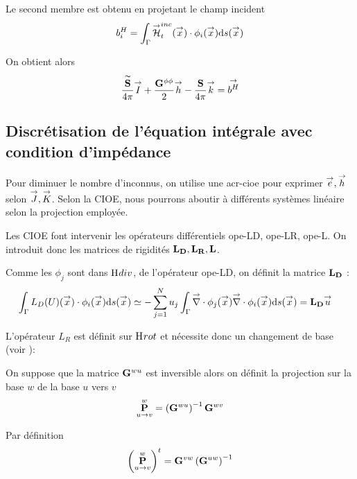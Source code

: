       Le second membre est obtenu en projetant le champ incident 
      \begin{equation}
        b_i^H = \int_\Gamma \vH^{inc}_t(\vx) \cdot \phi_i(\vx)\dd{s}(\vx)
      \end{equation}

      On obtient alors 
      \begin{equation}
        \frac{\mSt}{4\pi}\vect{I} 
        + \frac{\mG{\phi}{\phi}}{2}\vect{h}
        - \frac{\mS}{4\pi}\vect{k} 
        = \vect{b^H}
      \end{equation}

  \subsection{Discrétisation de l'équation intégrale avec condition d'impédance}
    Pour diminuer le nombre d'inconnus, on utilise une \gls{acr-cioe} pour exprimer \(\vect{e}, \vect{h}\) selon \(\vect{J}, \vect{K}\). Selon la CIOE, nous pourrons aboutir à différents systèmes linéaire selon la projection employée. 

    Les CIOE font intervenir les opérateurs différentiels \gls{ope-LD}, \gls{ope-LR}, \gls{ope-L}. On introduit donc les matrices de rigidités \(\mLD,\mLR,\mL\).

    Comme les \(\phi_j\) sont dans \(\Hdiv\), de l'opérateur \gls{ope-LD}, on définit la matrice \(\mLD\) :
    \begin{align}
      \int_\Gamma L_D(U)(\vx) \cdot \phi_i(\vx) \dd{s}(\vx)  
        & \simeq - \sum_{j=1}^N u_j \int_\Gamma \vdiv \phi_j(\vx) \vdiv \phi_i(\vx) \dd{s}(\vx) = \mLD \vu
    \end{align}

    L'opérateur \(L_R\) est définit sur \(\Hrot\) et nécessite donc un changement de base (voir \cite[(13)]{stupfel_implementation_2015}):

    \begin{defn}
      On suppose que la matrice \(\mG{w}{u}\) est inversible alors on définit la projection sur la base \(w\) de la base \(u\) vers \(v\)
      \begin{equation}
        \mP{u}{v}{w} = \left(\mG{w}{u}\right)^{-1}\mG{w}{v}
      \end{equation}
    \end{defn}

    \begin{prop}
      Par définition
      \begin{equation}
        \left(\mP{u}{v}{w}\right)^t = \mG{v}{w}\left(\mG{u}{w}\right)^{-1}
      \end{equation}
    \end{prop}

